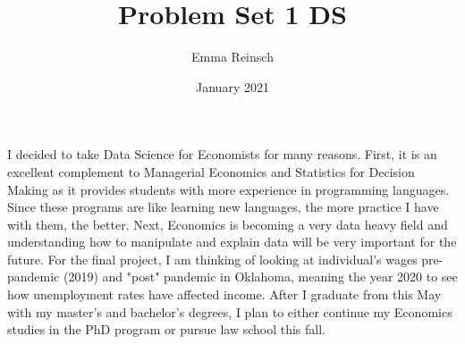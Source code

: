 \documentclass{article}
\title{Problem Set 1 DS}
\author{Emma Reinsch }
\date{January 2021}
\begin{document}
I decided to take Data Science for Economists for many reasons. 
First, it is an excellent complement to Managerial Economics and Statistics for Decision Making as it provides students with more experience in programming languages. 
Since these programs are like learning new languages, the more practice I have with them, the better. 
Next, Economics is becoming a very data heavy field and understanding how to manipulate and explain data will be very important for the future. 
For the final project, I am thinking of looking at individual's wages pre-pandemic (2019) and "post" pandemic in Oklahoma, meaning the year 2020 to see how unemployment rates have affected income. 
After I graduate from this May with my master's and bachelor's degrees, I plan to either continue my Economics studies in the PhD program or pursue law school this fall.
 


\begin{equation}
    [ a^2 + b^2 = c^2 ]
\end{equation}
\end{document}
